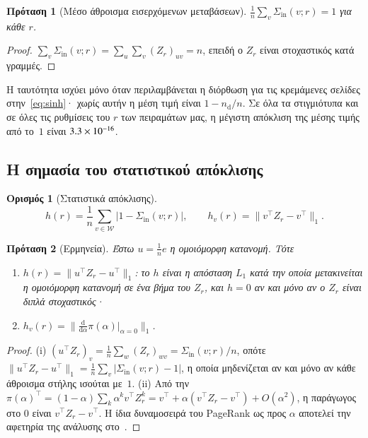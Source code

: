 \documentclass[11pt,a4paper]{article}
\newtheorem{proposition}{Πρόταση}
\theoremstyle{definition}
\newtheorem{definition}{Ορισμός}
\theoremstyle{remark}
\newcommand{\Sin}{\Sigma_{\mathrm{in}}}
\begin{document}
\begin{proposition}[Μέσο άθροισμα εισερχόμενων μεταβάσεων]\label{prop:mean}
$\frac1n\sum_v\Sin(v;r)=1$ για κάθε $r$.
\end{proposition}
\begin{proof}
$\sum_v\Sin(v;r)=\sum_u\sum_v(Z_r)_{uv}=n$, επειδή ο $Z_r$ είναι στοχαστικός κατά γραμμές.
\end{proof}
\noindent
Η ταυτότητα ισχύει μόνο όταν περιλαμβάνεται η διόρθωση για τις κρεμάμενες σελίδες
στην~\eqref{eq:sinh}· χωρίς αυτήν η μέση τιμή είναι $1-n_{\mathrm d}/n$. Σε όλα τα στιγμιότυπα και σε
όλες τις ρυθμίσεις του $r$ των πειραμάτων μας, η μέγιστη απόκλιση της μέσης τιμής από το~$1$ είναι
$3.3\times10^{-16}$.

\subsection{Η σημασία του στατιστικού απόκλισης}
\begin{definition}[Στατιστικά απόκλισης]
\[
h(r)=\frac1n\sum_{v\in\mathcal W}\bigl|1-\Sin(v;r)\bigr|,\qquad
h_v(r)=\bigl\|v^\top Z_r-v^\top\bigr\|_1 .
\]
\end{definition}

\begin{proposition}[Ερμηνεία]\label{prop:interp}
Έστω $u=\frac1n e$ η ομοιόμορφη κατανομή. Τότε
\begin{enumerate}[label=(\roman*),leftmargin=2em,itemsep=0pt]
\item $h(r)=\|u^\top Z_r-u^\top\|_1$: το $h$ είναι η απόσταση $L_1$ κατά την οποία μετακινείται η
ομοιόμορφη κατανομή σε ένα βήμα του $Z_r$, και $h=0$ αν και μόνο αν ο $Z_r$ είναι διπλά στοχαστικός·
\item $h_v(r)=\bigl\|\tfrac{\mathrm d}{\mathrm d\alpha}\pi(\alpha)\big|_{\alpha=0}\bigr\|_1$.
\end{enumerate}
\end{proposition}
\begin{proof}
(i) $(u^\top Z_r)_v=\frac1n\sum_w(Z_r)_{wv}=\Sin(v;r)/n$, οπότε
$\|u^\top Z_r-u^\top\|_1=\frac1n\sum_v|\Sin(v;r)-1|$, η οποία μηδενίζεται αν και μόνο αν κάθε άθροισμα
στήλης ισούται με~$1$.
(ii) Από την
$\pi(\alpha)^\top=(1-\alpha)\sum_k\alpha^kv^\top Z_r^k=v^\top+\alpha(v^\top Z_r-v^\top)+O(\alpha^2)$,
η παράγωγος στο $0$ είναι $v^\top Z_r-v^\top$. Η ίδια δυναμοσειρά του PageRank ως προς $\alpha$
αποτελεί την αφετηρία της ανάλυσης στο~\cite{boldi09}.
\end{proof}
\end{document}
